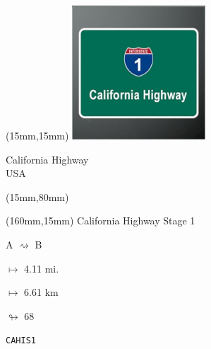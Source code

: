 \begin{textblock*}{50mm}(15mm,15mm)%
\includegraphics[width=50mm]{LG/2015-05-20_00077.png}
\par California Highway\\ USA
\end{textblock*}
\begin{textblock*}{185mm}(15mm,80mm)%
\end{textblock*}
\begin{textblock*}{40mm}(160mm,15mm)%
California Highway Stage 1
\par A $\rightsquigarrow$ B
\Large
\par$\mapsto$ 4.11 mi.
\par$\mapsto$ 6.61 km
\par$\looparrowright$ 68
\par\hfill\tiny\tt CAHIS1\\
\end{textblock*}
\null\newpage

